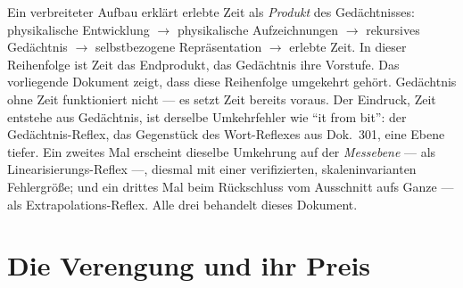 Ein verbreiteter Aufbau erklärt erlebte Zeit als \emph{Produkt} des Gedächtnisses:
physikalische Entwicklung $\to$ physikalische Aufzeichnungen $\to$ rekursives Gedächtnis
$\to$ selbstbezogene Repräsentation $\to$ erlebte Zeit. In dieser Reihenfolge ist Zeit das
Endprodukt, das Gedächtnis ihre Vorstufe. Das vorliegende Dokument zeigt, dass diese
Reihenfolge umgekehrt gehört. Gedächtnis ohne Zeit funktioniert nicht --- es setzt Zeit
bereits voraus. Der Eindruck, Zeit entstehe aus Gedächtnis, ist derselbe Umkehrfehler wie
\enquote{it from bit}: der Gedächtnis-Reflex, das Gegenstück des Wort-Reflexes aus
Dok.~301, eine Ebene tiefer. Ein zweites Mal erscheint dieselbe Umkehrung auf der
\emph{Messebene} --- als Linearisierungs-Reflex ---, diesmal mit einer verifizierten,
skaleninvarianten Fehlergröße; und ein drittes Mal beim Rückschluss vom Ausschnitt aufs
Ganze --- als Extrapolations-Reflex. Alle drei behandelt dieses Dokument.

\section{Die Verengung und ihr Preis}

